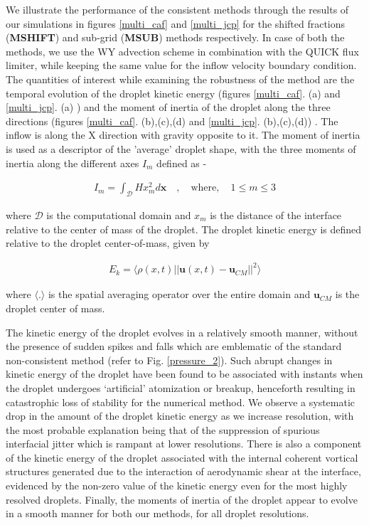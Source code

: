 We illustrate the performance of the consistent methods through the 
results of our simulations in figures \ref{multi_caf} and \ref{multi_jcp}
for the shifted fractions (\textbf{MSHIFT}) and sub-grid (\textbf{MSUB}) methods respectively. 
In case of both the methods, we use the WY advection scheme in combination with the QUICK flux limiter, 
while keeping the same value for the inflow velocity boundary condition. 
The quantities of interest while examining the robustness of the 
method are the temporal evolution of the droplet kinetic energy 
(figures \ref{multi_caf}. (a) and \ref{multi_jcp}. (a) ) 
and the moment of inertia of the droplet along the three directions 
(figures \ref{multi_caf}. (b),(c),(d) and \ref{multi_jcp}. (b),(c),(d)) . 
The inflow is along the X direction with gravity opposite to it. 
The moment of inertia is used as a descriptor of the 'average' droplet shape, 
with the three moments of inertia along the different axes $I_m$ defined as - 


\begin{align}
	I_m = \int_{\mathcal{D}} H x_m^2 d \boldsymbol{x} \quad , \quad \text{where}, \quad 1 \le m \le 3
\end{align}

where $\mathcal{D}$ is the computational domain and $x_m$ is the 
distance of the interface relative to the center of mass of the droplet.   
The droplet kinetic energy is defined relative to the droplet center-of-mass, given by 
 
\begin{align}
	E_k = \langle \rho(x,t) || \boldsymbol{u}(x,t) - \boldsymbol{u}_{CM}||^2 \rangle
	\label{drop_ke}
\end{align}

where $ \langle . \rangle$ is the spatial averaging operator over the  
entire domain and $\boldsymbol{u}_{CM}$ is the droplet center of mass.


The kinetic energy of the droplet evolves in a relatively smooth manner, 
without the presence of sudden spikes and falls which are emblematic of 
the standard non-consistent method (refer to Fig. \ref{pressure_2}). 
Such abrupt changes in kinetic energy of the droplet have been 
found to be associated with instants when the droplet undergoes 
`artificial' atomization or breakup, henceforth resulting in 
catastrophic loss of stability for the numerical method. 
We observe a systematic drop in the amount of the droplet 
kinetic energy as we increase resolution, with the most probable explanation 
being that of the suppression of spurious interfacial 
jitter which is rampant at lower resolutions. 
There is also a component of the kinetic energy of the droplet 
associated with the internal coherent vortical structures generated due to 
the interaction of aerodynamic shear at the interface, 
evidenced by the non-zero value of the kinetic 
energy even for the most highly resolved droplets. 
Finally, the moments of inertia of the droplet appear to evolve in a smooth manner 
for both our methods, for all droplet resolutions.

